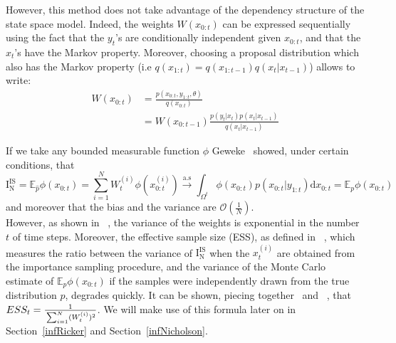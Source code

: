 \documentclass[12pt]{article}
\begin{document}
	However, this method does not take advantage of the dependency structure of the state space model. Indeed, the weights $W(x_{0:t})$ can be expressed sequentially using the fact that the $y_t$'s are conditionally independent given $x_{0:t}$, and that the $x_t$'s have the Markov property. Moreover, choosing a proposal distribution which also has the Markov property (i.e $q(x_{1:t})=q(x_{1:t-1})q(x_t| x_{t-1})$) allows to write:
	\begin{align}
	W(x_{0:t}) & = \frac{p(x_{0:t},y_{1:t}, \theta)}{q(x_{0:t})} \\
	& = W(x_{0:t-1})\frac{p(y_t|x_t)p(x_t|x_{t-1})}{q(x_t|x_{t-1})}
	\end{align}
	
	If we take any bounded measurable function $\phi$ Geweke~\cite{Geweke1989} showed, under certain conditions, that
	\begin{equation*}
	 \mathrm{I_N^{IS}}=\mathbb{E}_{\hat{p}}\phi(x_{0:t}) = \sum_{i=1}^{N} W_t^{(i)} \phi(x_{0:t}^{(i)}) \xrightarrow{\mathrm{a.s}} \int_{\Omega^t} \phi({x_{0:t}})p(x_{0:t}|y_{1:t})\mathrm{d}x_{0:t}=\mathbb{E}_{p}\phi(x_{0:t})
	\end{equation*}
	and moreover that the bias and the variance are $\mathcal{O}(\frac{1}{N})$.\\
	
	However, as shown in ~\cite{kong1994sequential}, the variance of the weights is exponential in the number $t$ of time steps. Moreover, the effective sample size (ESS), as defined in ~\cite{liu2008monte}, which measures the ratio between the variance of $\mathrm{I_N^{IS}}$ when the $x_t^{(i)}$ are obtained from the importance sampling procedure, and the variance of the Monte Carlo estimate of $\mathbb{E}_{p}\phi(x_{0:t})$ if the samples were independently drawn from the true distribution $p$, degrades quickly.  It can be shown, piecing together~\cite[][pp.~35-36]{liu2008monte} and ~\cite[][pp.~98-100]{robert2009introducing}, that  $ESS_t = \frac{1}{\strut \sum_{i=1}^{N} (W_t^{(i)})^2}$. We will make use of this formula later on in Section~\ref{infRicker} and Section~\ref{infNicholson}.
	
\end{document}
